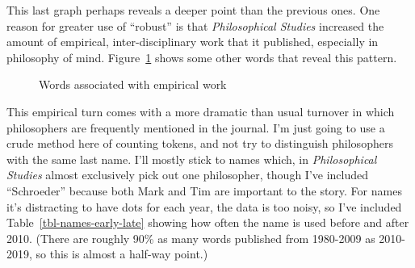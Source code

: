 \documentclass[
  10pt,
  letterpaper,
  DIV=11,
  numbers=noendperiod,
  twoside]{scrartcl}
\begin{document}
This last graph perhaps reveals a deeper point than the previous ones.
One reason for greater use of ``robust'' is that \emph{Philosophical
Studies} increased the amount of empirical, inter-disciplinary work that
it published, especially in philosophy of mind.
Figure~\ref{fig-empirical-words} shows some other words that reveal this
pattern.

\begin{figure}


\caption{\label{fig-empirical-words}Words associated with empirical
work}

\end{figure}%

This empirical turn comes with a more dramatic than usual turnover in
which philosophers are frequently mentioned in the journal. I'm just
going to use a crude method here of counting tokens, and not try to
distinguish philosophers with the same last name. I'll mostly stick to
names which, in \emph{Philosophical Studies} almost exclusively pick out
one philosopher, though I've included ``Schroeder'' because both Mark
and Tim are important to the story. For names it's distracting to have
dots for each year, the data is too noisy, so I've included
Table~\ref{tbl-names-early-late} showing how often the name is used
before and after 2010. (There are roughly 90\% as many words published
from 1980-2009 as 2010-2019, so this is almost a half-way point.)
\end{document}
